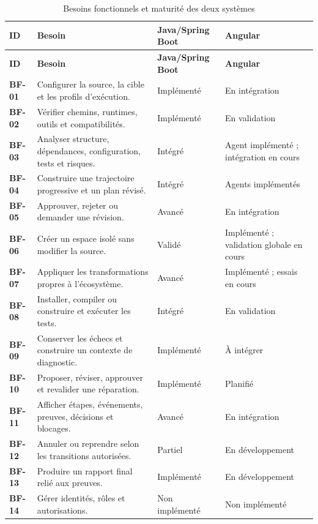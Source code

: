 \scriptsize
\begin{longtable}{|>{\bfseries\RaggedRight\arraybackslash}p{1cm}|>{\RaggedRight\arraybackslash}p{6.1cm}|>{\RaggedRight\arraybackslash}p{3.2cm}|>{\RaggedRight\arraybackslash}p{3.2cm}|}
    \caption{Besoins fonctionnels et maturité des deux systèmes}\label{tab:bf-ch1}\\
    \hline
    \rowcolor{cgilight!95}
    \textbf{ID} & \textbf{Besoin} & \textbf{Java/Spring Boot} & \textbf{Angular} \\
    \hline
    \endfirsthead
    \hline
    \rowcolor{cgilight!95}
    \textbf{ID} & \textbf{Besoin} & \textbf{Java/Spring Boot} & \textbf{Angular} \\
    \hline
    \endhead
    BF-01 & Configurer la source, la cible et les profils d'exécution. & Implémenté & En intégration \\
    \hline
    BF-02 & Vérifier chemins, runtimes, outils et compatibilités. & Implémenté & En validation \\
    \hline
    BF-03 & Analyser structure, dépendances, configuration, tests et risques. & Intégré & Agent implémenté ; intégration en cours \\
    \hline
    BF-04 & Construire une trajectoire progressive et un plan révisé. & Intégré & Agents implémentés \\
    \hline
    BF-05 & Approuver, rejeter ou demander une révision. & Avancé & En intégration \\
    \hline
    BF-06 & Créer un espace isolé sans modifier la source. & Validé & Implémenté ; validation globale en cours \\
    \hline
    BF-07 & Appliquer les transformations propres à l'écosystème. & Avancé & Implémenté ; essais en cours \\
    \hline
    BF-08 & Installer, compiler ou construire et exécuter les tests. & Intégré & En validation \\
    \hline
    BF-09 & Conserver les échecs et construire un contexte de diagnostic. & Implémenté & À intégrer \\
    \hline
    BF-10 & Proposer, réviser, approuver et revalider une réparation. & Implémenté & Planifié \\
    \hline
    BF-11 & Afficher étapes, événements, preuves, décisions et blocages. & Avancé & En intégration \\
    \hline
    BF-12 & Annuler ou reprendre selon les transitions autorisées. & Partiel & En développement \\
    \hline
    BF-13 & Produire un rapport final relié aux preuves. & Implémenté & En développement \\
    \hline
    BF-14 & Gérer identités, rôles et autorisations. & Non implémenté & Non implémenté \\
    \hline
\end{longtable}
\normalsize

